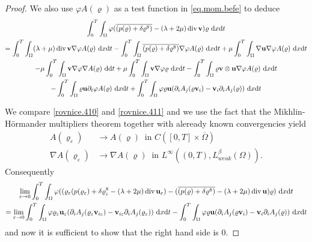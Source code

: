 \documentclass{article}
\DeclareMathOperator{\diver}{div}
\newcommand{\bu}{{\bf u}}
\newcommand{\vu}{\bu}
\newcommand{\bv}{{\bf v}}
\newcommand{\vv}{\bv}
\newcommand{\pat}{\partial_t}
\numberwithin{equation}{section}
\begin{document}
\begin{proof}
We also use $\varphi A(\varrho)$ as a test function in \eqref{eq.mom.befe} to deduce
\begin{multline}
\int_0^T\int_\Omega \varphi  (\overline{(p(\varrho) + \delta \varrho^8)} - (\lambda +2\mu) \diver \vv)\varrho \ {\rm d}x{\rm d}t\\
\label{rovnice.411}%
= \int_0^T\int_\Omega (\lambda + \mu) \diver \vv \nabla \varphi A(\varrho)\ {\rm d}x{\rm d}t -\int_0^T\int_\Omega \overline{(p(\varrho) + \delta \varrho^8)} \nabla \varphi A(\varrho)  \ {\rm d}x{\rm d}t + \mu\int_0^T\int_\Omega \nabla \vu \nabla \varphi A(\varrho)\ {\rm d}x{\rm d}t\\
%
-\mu \int_0^T\int_\Omega \vv \nabla \varphi \nabla A(\varrho)\ {\rm d}{\rm d}t + \mu \int_0^T\int_\Omega \vv \nabla \varphi \varrho \ {\rm d}x{\rm d}t - \int_0^T\int_\Omega \varrho \vv \otimes \vu \nabla \varphi A(\varrho)\ {\rm d}x{\rm d}t\\
%
-\int_0^T\int_\Omega\varrho \vu \pat \varphi A(\varrho)\ {\rm d}x{\rm d}t + \int_0^T\int_\Omega \varphi \varrho \vu (\partial_i A_j(\varrho \vv_i) - \vv_i \partial_i A_j(\varrho))\ {\rm d}x{\rm d}t
\end{multline}

We compare \eqref{rovnice.410} and \eqref{rovnice.411} and we use the fact that the Mikhlin-H\"ormander  multipliers theorem \cite[Theorem 5.2.7]{grafakos} together with aleready known convergencies yield
\begin{equation*}
\begin{split}
A(\varrho_\varepsilon)&\to A(\varrho)\ \mbox{ in }C([0,T]\times \overline\Omega)\\
\nabla A(\varrho_\varepsilon)&\to \nabla A(\varrho)\ \mbox{ in }L^\infty((0,T), L^\beta_{weak}(\Omega)).
\end{split}
\end{equation*}
Consequently
\begin{multline*}
\lim_{\varepsilon\to 0} \int_0^T\int_\Omega \varphi ( (\varrho_\varepsilon (p(\varrho_\varepsilon) + \delta\varrho_\varepsilon^8 - (\lambda + 2\mu)\diver \vu_\varepsilon) - (\overline{(p(\varrho) + \delta \varrho^8)} - (\lambda + 2\mu)\diver \vu)\varrho)\ {\rm d}x{\rm d}t\\
 = \lim_{\varepsilon\to 0}\int_0^T\int_\Omega \varphi \varrho_\varepsilon \vu_\varepsilon (\partial_i A_j(\varrho_\varepsilon \vv_{i\varepsilon}) - \vv_{i\varepsilon} \partial_i A_j(\varrho_\varepsilon))\ {\rm d}x{\rm d}t 
 - \int_0^T\int_\Omega \varphi \varrho \vu (\partial_i A_j(\varrho \vv_i) - \vv_i \partial_i A_j(\varrho))\ {\rm d}x{\rm d}t
\end{multline*}
and now it is sufficient to show that the right hand side is $0$. 


\end{proof}
\end{document}
